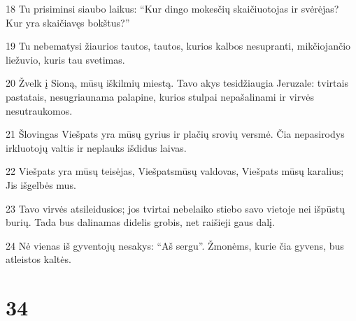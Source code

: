 \par 18 Tu prisiminsi siaubo laikus: “Kur dingo mokesčių skaičiuotojas ir svėrėjas? Kur yra skaičiavęs bokštus?” 
\par 19 Tu nebematysi žiaurios tautos, tautos, kurios kalbos nesupranti, mikčiojančio liežuvio, kuris tau svetimas. 
\par 20 Žvelk į Sioną, mūsų iškilmių miestą. Tavo akys tesidžiaugia Jeruzale: tvirtais pastatais, nesugriaunama palapine, kurios stulpai nepašalinami ir virvės nesutraukomos. 
\par 21 Šlovingas Viešpats yra mūsų gyrius ir plačių srovių versmė. Čia nepasirodys irkluotojų valtis ir neplauks išdidus laivas. 
\par 22 Viešpats yra mūsų teisėjas, Viešpats­mūsų valdovas, Viešpats­ mūsų karalius; Jis išgelbės mus. 
\par 23 Tavo virvės atsileidusios; jos tvirtai nebelaiko stiebo savo vietoje nei išpūstų burių. Tada bus dalinamas didelis grobis, net raišieji gaus dalį. 
\par 24 Nė vienas iš gyventojų nesakys: “Aš sergu”. Žmonėms, kurie čia gyvens, bus atleistos kaltės.



\chapter{34}


